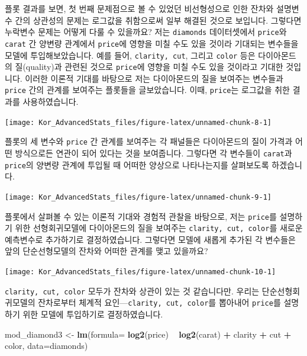 \documentclass[
]{book}
\newenvironment{Shaded}{\begin{snugshade}}{\end{snugshade}}
\newcommand{\DataTypeTok}[1]{\textcolor[rgb]{0.13,0.29,0.53}{#1}}
\newcommand{\KeywordTok}[1]{\textcolor[rgb]{0.13,0.29,0.53}{\textbf{#1}}}
\newcommand{\NormalTok}[1]{#1}
\newcommand{\OperatorTok}[1]{\textcolor[rgb]{0.81,0.36,0.00}{\textbf{#1}}}
\newcommand{\StringTok}[1]{\textcolor[rgb]{0.31,0.60,0.02}{#1}}
\begin{document}
플롯 결과를 보면, 첫 번째 문제점으로 볼 수 있었던 비선형성으로 인한 잔차와 설명변수 간의 상관성의 문제는 로그값을 취함으로써 일부 해결된 것으로 보입니다. 그렇다면 누락변수 문제는 어떻게 다룰 수 있을까요? 저는 \texttt{diamonds} 데이터셋에서 \texttt{price}와 \texttt{carat} 간 양변량 관계에서 \texttt{price}에 영향을 미칠 수도 있을 것이라 기대되는 변수들을 모델에 투입해보았습니다. 예를 들어, \texttt{clarity,\ cut}, 그리고 \texttt{color} 등은 다이아몬드의 질(quality)과 관련된 것으로 \texttt{price}에 영향을 미칠 수도 있을 것이라고 기대한 것입니다. 이러한 이론적 기대를 바탕으로 저는 다이아몬드의 질을 보여주는 변수들과 \texttt{price} 간의 관계를 보여주는 플롯들을 글보았습니다. 이때, \texttt{price}는 로그값을 취한 결과를 사용하였습니다.

\begin{center}\texttt{[image: Kor\_AdvancedStats\_files/figure-latex/unnamed-chunk-8-1]} \end{center}

플롯의 세 변수와 \texttt{price} 간 관계를 보여주는 각 패널들은 다이아몬드의 질이 가격과 어떤 방식으로든 연관이 되어 있다는 것을 보여줍니다. 그렇다면 각 변수들이 \texttt{carat}과 \texttt{price}의 양변량 관계에 투입될 때 어떠한 양상으로 나타나는지를 살펴보도록 하겠습니다.

\begin{center}\texttt{[image: Kor\_AdvancedStats\_files/figure-latex/unnamed-chunk-9-1]} \end{center}

플롯에서 살펴볼 수 있는 이론적 기대와 경험적 관찰을 바탕으로, 저는 \texttt{price}를 설명하기 위한 선형회귀모델에 다이아몬드의 질을 보여주는 \texttt{clarity,\ cut,\ color}를 새로운 예측변수로 추가하기로 결정하였습니다. 그렇다면 모델에 새롭게 추가된 각 변수들은 앞의 단순선형모델의 잔차와 어떠한 관계를 맺고 있을까요?

\begin{center}\texttt{[image: Kor\_AdvancedStats\_files/figure-latex/unnamed-chunk-10-1]} \end{center}

\texttt{clarity,\ cut,\ color} 모두가 잔차와 상관이 있는 것 같습니다만. 우리는 단순선형회귀모델의 잔차로부터 체계적 요인---\texttt{clarity,\ cut,\ color}를 뽑아내어 \texttt{price}를 설명하기 위한 모델에 투입하기로 결정하였습니다.

\begin{Shaded}
\begin{Highlighting}[]
\NormalTok{mod_diamond3 <-}\StringTok{ }\KeywordTok{lm}\NormalTok{(}\DataTypeTok{formula=} \KeywordTok{log2}\NormalTok{(price) }\OperatorTok{~}\StringTok{ }\KeywordTok{log2}\NormalTok{(carat) }\OperatorTok{+}\StringTok{ }
\StringTok{                     }\NormalTok{clarity }\OperatorTok{+}\StringTok{ }\NormalTok{cut }\OperatorTok{+}\StringTok{ }\NormalTok{color, }\DataTypeTok{data=}\NormalTok{diamonds)}
\end{Highlighting}
\end{Shaded}
\end{document}
